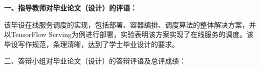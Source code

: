 
{
    \bfseries
    \noindent 一、指导教师对毕业论文（设计）的评语：\\
}

该毕设在线服务调度的实现，包括部署、容器编排、调度算法的整体解决方案，并以TensorFlow Serving为例进行部署，实验表明该方案实现了在线服务的调度。该毕设写作规范，条理清晰，达到了学士毕业设计的要求。

{
    \bfseries
    \signature{指导教师（签名）}

    \noindent 二、答辩小组对毕业论文（设计）的答辩评语及总评成绩：\\

    \mbox{} \vfill

    \finaleval[][][][][]

    \signature{负责人（签名）}
}
